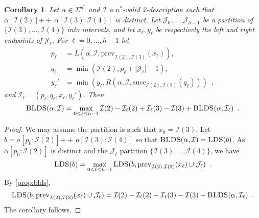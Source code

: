 \documentclass[12pt]{article}
\newcommand{\concat}{\ensuremath{+\!\!\!\!+\,}}
\newcommand{\Iset}{\mathcal{I}}
\newcommand{\Jset}{\mathcal{J}}
\newcommand{\blds}{\textsc{BLDS}}
\newcommand{\prev}{\mathrm{prev}}
\newcommand{\suc}{\mathrm{succ}}
\newcommand{\upto}{\mathbin{:}}
\newcommand{\lds}{\textsc{LDS}}
\newtheorem{corollary}[theorem]{Corollary}
\theoremstyle{definition}
\begin{document}
\begin{corollary}
\label{cor:h}
Let $\alpha \in \Sigma^{n^*}$ and $\Iset$ a $n^*$-valid 2-description such that $\alpha[\Iset(2)] \concat \alpha[\Iset(3) \upto \Iset(4)]$ is distinct.
Let $\Jset_0, \ldots, \Jset_{h-1}$ be a partition of $\{\Iset(3), \ldots, \Iset(4)\}$ into intervals, and let $x_\ell, y_\ell$ be respectively the left and right endpoints of $\Jset_\ell$.    For $\ell = 0, \ldots, h-1$ let 
\begin{align*}
p_\ell &= L(\alpha, \Iset, \prev_{\Iset(2), \Iset(3)}(x_\ell)), \\
q_\ell &= \min(\Iset(2), p_\ell+|\Jset_\ell|-1), \\
y_\ell'&= \min(y_\ell, R(\alpha, \Iset, \suc_{\Iset(2), \Iset(3)}(q_\ell))) \enspace,
\end{align*}
and $\Iset_\ell = (p_\ell, q_\ell, x_\ell, y_\ell')$.
Then
\[
\blds(\alpha, \Iset) = \max_{0 \le \ell \le h-1} 
\Iset(2) - \Iset_\ell(2) + \Iset_\ell(3) - \Iset(3) + \blds(\alpha, \Iset_\ell) \enspace .
\]
\end{corollary}

\begin{proof}
We may assume the partition is such that $x_0 = \Iset(3)$.
Let $b = a[p_0 \upto \Iset(2)] \concat a[\Iset(3) \upto \Iset(4)]$ so that $\blds(\alpha, \Iset) = \lds(b)$.  
As $\alpha[p_0 \upto \Iset(2)]$ is distinct and the $\Jset_\ell$ partition $\{\Iset(3), \ldots, \Iset(4)\}$, we have
\[
\lds(b) = \max_{0 \le \ell \le h - 1} \lds(b, \prev_{\Iset(2), \Iset(3)}(x_\ell) \cup \Jset_\ell) \enspace.
\]
By \cref{prop:blds}, 
\[
\lds(b, \prev_{\Iset(2), \Iset(3)}(x_\ell) \cup \Jset_\ell) = \Iset(2) - 
\Iset_\ell(2) + \Iset_\ell(3) - \Iset(3) + \blds(\alpha, \Iset_\ell) \enspace .
\]
The corollary follows.
\end{proof}
\end{document}
